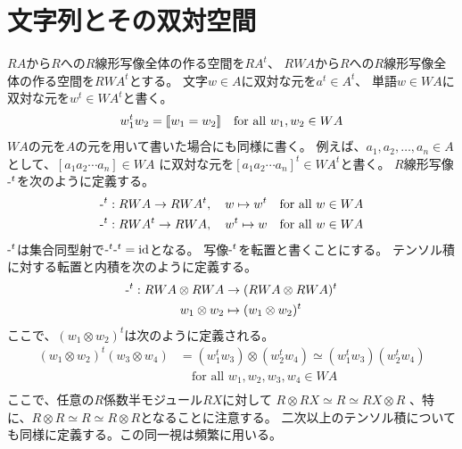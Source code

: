 \section{文字列とその双対空間}\label{s1:文字列とその双対空間} %
	$RA$から$R$への$R$線形写像全体の作る空間を$RA^t$、
	$RWA$から$R$への$R$線形写像全体の作る空間を$RWA^t$とする。
	文字$w\in A$に双対な元を$a^t\in A^t$、
	単語$w\in WA$に双対な元を$w^t\in WA^t$と書く。
	\begin{equation*}\begin{split} %
		w_1^t w_2 = \jump{w_1=w_2} \quad\text{for all }w_1,w_2\in WA
	\end{split}\end{equation*} %
	$WA$の元を$A$の元を用いて書いた場合にも同様に書く。
	例えば、$a_1,a_2,\dots, a_n\in A$として、$[a_1a_2\cdots a_n]\in WA$
	に双対な元を$[a_1a_2\cdots a_n]^t\in WA^t$と書く。
	$R$線形写像$\mypowop{t}$を次のように定義する。
	\begin{equation*}\begin{split} %
		\mypowop{t}:RWA\to RWA^t,\quad w\mapsto w^t \quad\text{for all }w\in WA \\
		\mypowop{t}:RWA^t\to RWA,\quad w^t\mapsto w \quad\text{for all }w\in WA \\
	\end{split}\end{equation*} %
	$\mypowop{t}$は集合同型射で$\mypowop{t}\mypowop{t}=\myid$となる。
	写像$\mypowop{t}$を転置と書くことにする。
	テンソル積に対する転置と内積を次のように定義する。
	\begin{equation*}\begin{split} %
		\mypowop{t}:RWA\otimes RWA &\to (RWA\otimes RWA)^t \\
		w_1\otimes w_2 &\mapsto (w_1\otimes w_2)^t
	\end{split}\end{equation*} %
	ここで、$(w_1\otimes w_2)^t$は次のように定義される。
	\begin{equation*}\begin{split} %
		(w_1\otimes w_2)^t(w_3\otimes w_4)
			& =(w_1^t w_3)\otimes (w_2^t w_4) \simeq (w_1^t w_3)(w_2^t w_4) \\
		&\quad\text{for all }w_1,w_2,w_3,w_4\in WA \\
	\end{split}\end{equation*} %
	ここで、任意の$R$係数半モジュール$RX$に対して
	$R\otimes RX\simeq R\simeq RX\otimes R$
	、特に、$R\otimes R\simeq R\simeq R\otimes R$となることに注意する。
	二次以上のテンソル積についても同様に定義する。この同一視は頻繁に用いる。

